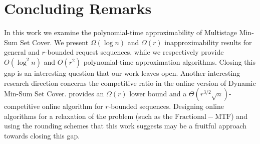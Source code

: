 \section{Concluding Remarks}
In this work we examine the polynomial-time approximability of Multistage Min-Sum Set Cover. We present $\Omega(\log n)$ and $\Omega(r)$ inapproximability results for general and $r$-bounded request sequences, while we respectively provide $O(\log^2 n)$ and $O(r^2)$ polynomial-time approximation algorithms. Closing this gap is an interesting question that our work leaves open. Another interesting research direction concerns the competitive ratio in the online version of Dynamic Min-Sum Set Cover. 
\cite{FLPS20} provides an $\Omega(r)$ lower bound and a $\Theta\left(r^{3/2}\sqrt{n}\right)$-competitive online algorithm for $r$-bounded sequences. Designing online algorithms for a relaxation of the problem (such as the $\mathrm{Fractional}-\mathrm{MTF}$) and using the rounding schemes that this work suggests may be a fruitful approach towards closing this gap. 